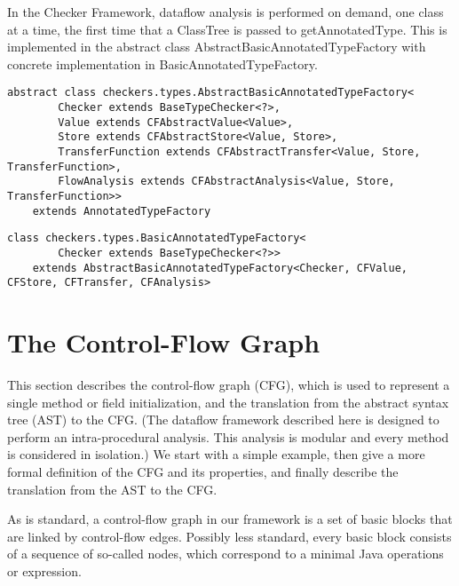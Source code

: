     In the Checker Framework, dataflow analysis is performed on demand, one class at a time, the first time that a ClassTree is passed to getAnnotatedType.   This is implemented in the abstract class AbstractBasicAnnotatedTypeFactory with concrete implementation in BasicAnnotatedTypeFactory.
    
    \begin{verbatim}abstract class checkers.types.AbstractBasicAnnotatedTypeFactory<
        Checker extends BaseTypeChecker<?>,
        Value extends CFAbstractValue<Value>,
        Store extends CFAbstractStore<Value, Store>,
        TransferFunction extends CFAbstractTransfer<Value, Store, TransferFunction>,
        FlowAnalysis extends CFAbstractAnalysis<Value, Store, TransferFunction>>
    extends AnnotatedTypeFactory\end{verbatim}
    
    \begin{verbatim}class checkers.types.BasicAnnotatedTypeFactory<
        Checker extends BaseTypeChecker<?>>
    extends AbstractBasicAnnotatedTypeFactory<Checker, CFValue, CFStore, CFTransfer, CFAnalysis>\end{verbatim}






\section{The Control-Flow Graph}
\label{sec:cfg}


This section
describes the control-flow graph (CFG), which is used to represent a single method or field initialization, and the
translation from the abstract syntax tree (AST) to the CFG\@.
(The dataflow framework described here is designed to perform an intra-procedural analysis.
This analysis is modular and every method is considered in isolation.)
 We start with a simple
example, then give a more formal definition of the CFG and its properties, and finally
describe the translation from the AST to the CFG.

As is standard, a control-flow graph in our framework is a set of basic blocks
that are linked by control-flow edges. Possibly less standard,
every basic block consists of a sequence
of so-called nodes, which correspond to a minimal Java operations or expression.


